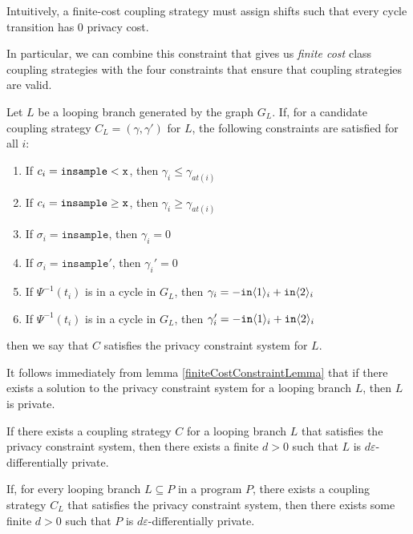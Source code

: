 Intuitively, a finite-cost coupling strategy must assign shifts such that every cycle transition has 0 privacy cost. 

In particular, we can combine this constraint that gives us \textit{finite cost} class coupling strategies with the four constraints that ensure that coupling strategies are valid. 

\begin{defn}\label{privacyConstraintSystem}
    Let $L$ be a looping branch generated by the graph $G_L$. If, for a candidate coupling strategy $C_L = (\gamma, \gamma')$ for $L$, the following constraints are satisfied for all $i$: \begin{enumerate}
        \item If $c_i = \lguard[\texttt{x}]$, then $\gamma_i\leq\gamma_{at(i)}$
        \item If $c_i = \gguard[\texttt{x}]$, then $\gamma_i\geq\gamma_{at(i)}$
        \item If $\sigma_i = \texttt{insample}$, then $\gamma_i=0$
        \item If $\sigma_i = \texttt{insample}'$, then $\gamma_i'=0$
        \item If $\Psi^{-1}(t_i)$ is in a cycle in $G_L$, then $\gamma_i = -\texttt{in}\brangle{1}_i+\texttt{in}\brangle{2}_i$
        \item If $\Psi^{-1}(t_i)$ is in a cycle in $G_L$, then $\gamma_i' = -\texttt{in}\brangle{1}_i+\texttt{in}\brangle{2}_i$
    \end{enumerate}
    then we say that $C$ satisfies the privacy constraint system for $L$. 
\end{defn}

It follows immediately from lemma \ref{finiteCostConstraintLemma} that if there exists a solution to the privacy constraint system for a looping branch $L$, then $L$ is private.

\begin{prop}\label{privacyFiniteCostProp}
    If there exists a coupling strategy $C$ for a looping branch $L$ that satisfies the privacy constraint system, then there exists a finite $d>0$ such that $L$ is $d\varepsilon$-differentially private. 
\end{prop}

\begin{cor}\label{svProgramPrivacyCorollary}
    If, for every looping branch $L\subseteq P$ in a program $P$, there exists a coupling strategy $C_L$ that satisfies the privacy constraint system, then there exists some finite $d>0$ such that $P$ is $d\varepsilon$-differentially private.    
\end{cor}


